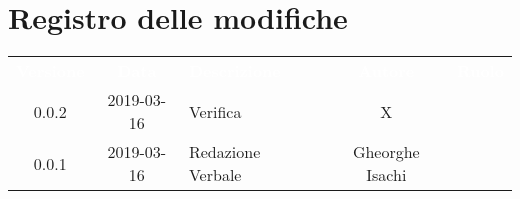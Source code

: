 \section*{Registro delle modifiche}
{
	\renewcommand{\arraystretch}{1.5}
	\centering
	\begin{longtable}{ c c  C{4cm}  c  c }
		
		\textcolor{white}{\textbf{Versione}} & \textcolor{white}{\textbf{Data}} & \textcolor{white}{\textbf{Descrizione}} & \textcolor{white}{\textbf{Autore}} & \textcolor{white}{\textbf{Ruolo}}\\
		
		0.0.2 & 2019-03-16 & Verifica & X & \ver{} \\
	
		0.0.1 & 2019-03-16 & Redazione Verbale & Gheorghe Isachi & \reda{}\\
		
	\end{longtable}

}